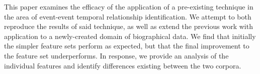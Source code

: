 This paper examines the efficacy of the application of a pre-existing technique in the area of event-event temporal relationship identification. We attempt to
 both reproduce the results of said technique, as well as extend the previous
 work with application to a newly-created domain of biographical data. We find
 that initially the simpler feature sets perform as expected, but that the final
 improvement to the feature set underperforms. In response, we provide an
 analysis of the individual features and identify differences existing between
 the two corpora.


